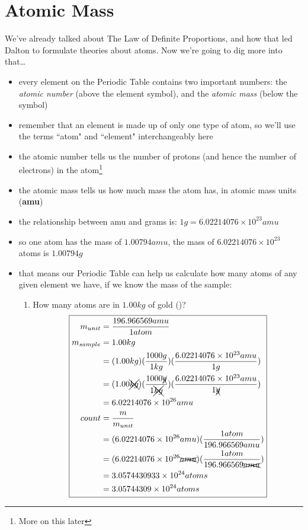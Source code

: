 \documentclass[11pt, oneside]{article}   	%
\begin{document}
\section{Atomic Mass}

We've already talked about The Law of Definite Proportions, and how that led Dalton to formulate theories about atoms. Now we're going to dig more into that\ldots

\begin{itemize}
\item every element on the Periodic Table contains two important numbers: the \emph{atomic number} (above the element symbol), and the \emph{atomic mass} (below the symbol)
\item remember that an element is made up of only one type of atom, so we'll use the terms ``atom" and ``element" interchangeably here
\item the atomic number tells us the number of protons (and hence the number of electrons) in the atom\footnote{More on this later}
\item the atomic mass tells us how much mass the atom has, in atomic mass units (\textbf{amu})
\item the relationship between amu and grams is: $ 1 g = 6.02214076 \times 10^{23} amu$
\item so one  atom has the mass of $ 1.00794 amu$, the mass of $ 6.02214076 \times 10^{23} $  atoms is $ 1.00794 g$
\item that means our Periodic Table can help us calculate how many atoms of any given element we have, if we know the mass of the sample:
\begin{enumerate}[label=Example \arabic*]
\item How many atoms are in $1.00 kg$ of gold ()? 
\begin{equation} 
\boxed{
\begin{split}
    m_{unit} &= \frac{196.966569 amu}{1 atom} \\
    m_{sample} &= 1.00 kg \\
                        &= ( 1.00 kg ) (\frac{1000 g}{1 kg}) ( \frac{6.02214076 \times 10^{23} amu}{1 g}) \\
                        &= ( 1.00 \xcancel{kg} ) (\frac{1000 \xcancel{g}}{1 \xcancel{kg}}) ( \frac{6.02214076 \times 10^{23} amu}{1 \xcancel{g}}) \\
                        &= 6.02214076 \times 10^{26} amu \\
   count &= \frac{m}{m_{unit}} \\
             &=  (6.02214076 \times 10^{26} amu) (\frac{1 atom}{196.966569 amu}) \\
             &=  (6.02214076 \times 10^{26} \xcancel{amu}) (\frac{1 atom}{196.966569 \xcancel{amu}}) \\
             &=  3.0574430933 \times 10^{24} atoms \\
             &=  3.05744309 \times 10^{24} atoms \\                   
 \end{split}
 }
 \end{equation}
 
\end{enumerate}
\end{itemize}
\end{document}
